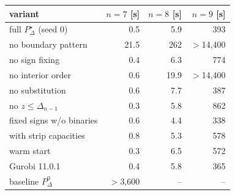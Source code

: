 \begin{tabular}{l r r r}
\toprule
variant & $n=7$ [s] & $n=8$ [s] & $n=9$ [s] \\
\midrule
full $P^\star_\Delta$ (seed 0) & 0.5 & 5.9 & 393 \\
no boundary pattern & 21.5 & 262 & $>$14,400 \\
no sign fixing & 0.4 & 6.3 & 774 \\
no interior order & 0.6 & 19.9 & $>$14,400 \\
no substitution & 0.6 & 7.7 & 387 \\
no $z\le\Delta_{n-1}$ & 0.3 & 5.8 & 862 \\
fixed signs w/o binaries & 0.6 & 4.4 & 338 \\
with strip capacities & 0.8 & 5.3 & 578 \\
warm start & 0.3 & 6.5 & 572 \\
Gurobi 11.0.1 & 0.4 & 5.8 & 365 \\
baseline $P^0_\Delta$ & $>$3,600 & -- & -- \\
\bottomrule
\end{tabular}
